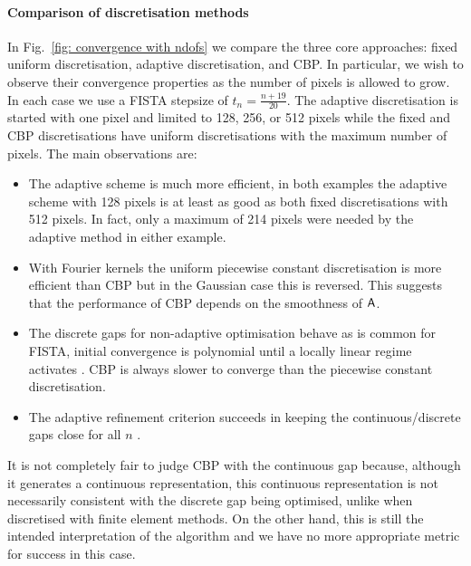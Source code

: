 \documentclass[smallextended]{svjour3}
\newcommand{\1}{\F{1}}
\newcommand{\edit}[3][1]{%
	\IfEq{#1}{2}{\def\mysecondvar{}}{\def\mysecondvar{#2}}%
	\ifx\mysecondvar\empty{}\else{%
		\IfEq{#1}{1}{%
			\ifmmode%
			\text{\color{red}\sout{\ensuremath{#2}}}%
			\else%
			{\color{red} \sout{#2}}%
			\fi%
		}{\color{red}#2}\ %
	}\fi{\color{darkgreen}#3}}
\begin{document}
	\paragraph{Comparison of discretisation methods}
	In Fig.~\ref{fig: convergence with ndofs} we compare the three core approaches: fixed uniform
	discretisation, adaptive discretisation, and CBP. In particular, we wish to observe their convergence properties as the number of pixels is allowed to grow. In each case we use a FISTA stepsize of $t_n = \frac{n+19}{20}$. The adaptive discretisation is started with one pixel and limited to 128, 256, or 512 pixels while the fixed and CBP discretisations have uniform discretisations with the maximum number of pixels. The main observations are:
	\begin{itemize}
		\item The adaptive scheme is much more efficient, in both examples the adaptive scheme with 128 pixels is at least as good as both fixed discretisations with 512 pixels. In fact, only a maximum of 214 pixels were needed by the adaptive method in either example.
		\item With Fourier kernels the uniform piecewise constant discretisation is more efficient than CBP but in the Gaussian case this is reversed. This suggests that the performance of CBP depends on the smoothness of $\mathsf{A}$.
		\item The discrete gaps for non-adaptive optimisation behave as is common for FISTA, initial convergence is polynomial until a locally linear regime activates \cite{Tao2016}. CBP is always slower to converge than the piecewise constant discretisation.
		\item The adaptive refinement criterion succeeds in keeping the continuous/discrete gaps close for all $n$\edit{}{, i.e. \eqref{eq: less than double gap bound}}.
	\end{itemize}
	It is not completely fair to judge CBP with the continuous gap because, although it generates a continuous representation, this continuous representation is not necessarily consistent with the discrete gap being optimised, unlike when discretised with finite element methods. On the other hand, this is still the intended interpretation of the algorithm and we have no more appropriate metric for success in this case.
	
\end{document}
